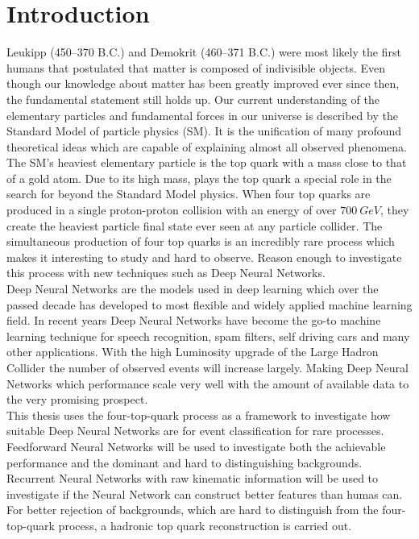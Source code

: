 \chapter{Introduction}
\label{sec:intro}

Leukipp (450–370 B.C.) and Demokrit (460–371 B.C.) were most likely the first humans that postulated that matter is composed of indivisible objects. Even though our knowledge about matter has been greatly improved ever since then, the fundamental statement still holds up. Our current understanding of the elementary particles and fundamental forces in our universe is described by the Standard Model of particle physics (SM). It is the unification of many profound theoretical ideas which are capable of explaining almost all observed phenomena. \\
The SM's heaviest elementary particle is the top quark with a mass close to that of a gold atom. Due to its high mass, plays the top quark a special role in the search for beyond the Standard Model physics. When four top quarks are produced in a single proton-proton collision with an energy of over $\SI{700}{GeV}$, they create the heaviest particle final state ever seen at any particle collider. The simultaneous production of four top quarks is an incredibly rare process which makes it interesting to study and hard to observe. Reason enough to investigate this process with new techniques such as Deep Neural Networks. \\
Deep Neural Networks are the models used in deep learning which over the passed decade has developed to most flexible and widely applied machine learning field. In recent years Deep Neural Networks have become the go-to machine learning technique for speech recognition, spam filters, self driving cars and many other applications. With the high Luminosity upgrade of the Large Hadron Collider the number of observed events will increase largely. Making Deep Neural Networks which performance scale very well with the amount of available data to the very promising prospect. \\
This thesis uses the four-top-quark process as a framework to investigate how suitable Deep Neural Networks are for event classification for rare processes. Feedforward Neural Networks will be used to investigate both the achievable performance and the dominant and hard to distinguishing backgrounds. Recurrent Neural Networks with raw kinematic information will be used to investigate if the Neural Network can construct better features than humas can. For better rejection of backgrounds, which are hard to distinguish from the four-top-quark process, a hadronic top quark reconstruction is carried out. \\
